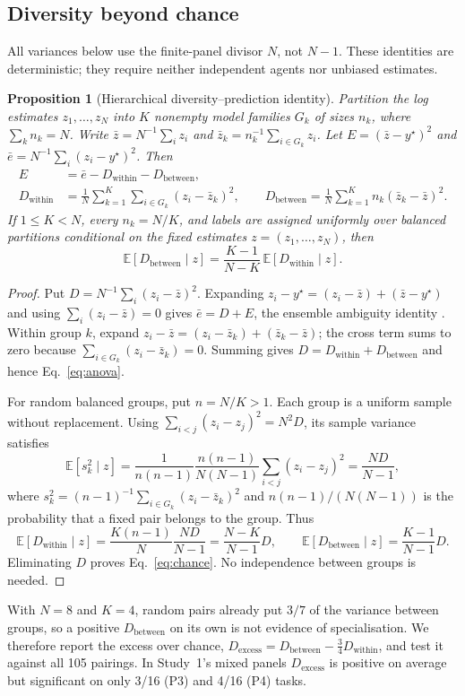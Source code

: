 \documentclass[10pt]{article}
\theoremstyle{manuscript}\newtheorem{proposition}{Proposition}
\newcommand{\E}{\mathbb E}
\newcommand{\Dw}{D_{\mathrm{within}}}
\newcommand{\Db}{D_{\mathrm{between}}}
\newcommand{\Dx}{D_{\mathrm{excess}}}
\begin{document}
\subsection{Diversity beyond chance}\label{sec:chance}
All variances below use the finite-panel divisor $N$, not $N-1$. These identities are deterministic; they require neither independent agents nor unbiased estimates.
\begin{proposition}[Hierarchical diversity--prediction identity]\label{prop:anova}
Partition the log estimates $z_1,\ldots,z_N$ into $K$ nonempty model families $G_k$ of sizes $n_k$, where $\sum_k n_k=N$. Write $\bar z=N^{-1}\sum_i z_i$ and $\bar z_k=n_k^{-1}\sum_{i\in G_k}z_i$. Let $E=(\bar z-y^\star)^2$ and $\bar e=N^{-1}\sum_i(z_i-y^\star)^2$. Then
\begin{equation}\label{eq:anova}
\begin{aligned}
E&=\bar e-\Dw-\Db,\\
\Dw&=\frac1N\sum_{k=1}^K\sum_{i\in G_k}(z_i-\bar z_k)^2,\qquad
\Db=\frac1N\sum_{k=1}^K n_k(\bar z_k-\bar z)^2.
\end{aligned}
\end{equation}
If $1\le K<N$, every $n_k=N/K$, and labels are assigned uniformly over balanced partitions conditional on the fixed estimates $z=(z_1,\ldots,z_N)$, then
\begin{equation}\label{eq:chance}
\E[\Db\mid z]=\frac{K-1}{N-K}\,\E[\Dw\mid z].
\end{equation}
\end{proposition}
\begin{proof}
Put $D=N^{-1}\sum_i(z_i-\bar z)^2$. Expanding $z_i-y^\star=(z_i-\bar z)+(\bar z-y^\star)$ and using $\sum_i(z_i-\bar z)=0$ gives $\bar e=D+E$, the ensemble ambiguity identity \citep{krogh1995,page2007}. Within group $k$, expand $z_i-\bar z=(z_i-\bar z_k)+(\bar z_k-\bar z)$; the cross term sums to zero because $\sum_{i\in G_k}(z_i-\bar z_k)=0$. Summing gives $D=\Dw+\Db$ and hence Eq.~\eqref{eq:anova}.

For random balanced groups, put $n=N/K>1$. Each group is a uniform sample without replacement. Using $\sum_{i<j}(z_i-z_j)^2=N^2D$, its sample variance satisfies
\[
\E[s_k^2\mid z]
=\frac{1}{n(n-1)}\frac{n(n-1)}{N(N-1)}
  \sum_{i<j}(z_i-z_j)^2=\frac{ND}{N-1},
\]
where $s_k^2=(n-1)^{-1}\sum_{i\in G_k}(z_i-\bar z_k)^2$ and $n(n-1)/(N(N-1))$ is the probability that a fixed pair belongs to the group. Thus
\[
\E[\Dw\mid z]=\frac{K(n-1)}{N}\frac{ND}{N-1}
=\frac{N-K}{N-1}D,\qquad
\E[\Db\mid z]=\frac{K-1}{N-1}D.
\]
Eliminating $D$ proves Eq.~\eqref{eq:chance}. No independence between groups is needed.
\end{proof}
\noindent With $N=8$ and $K=4$, random pairs already put $3/7$ of the variance between groups, so a positive $\Db$ on its own is not evidence of specialisation. We therefore report the excess over chance, \mbox{$\Dx=\Db-\frac34\Dw$}, and test it against all 105 pairings. In Study~1's mixed panels $\Dx$ is positive on average but significant on only 3/16 (P3) and 4/16 (P4) tasks.
\end{document}
